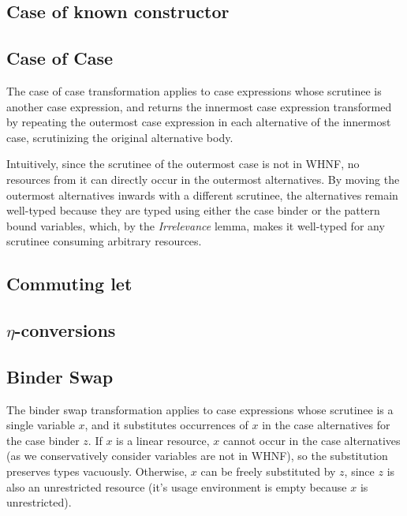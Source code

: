 \documentclass[acmsmall,review,anonymous,screen]{acmart}
\begin{document}
\subsection{Case of known constructor}



\subsection{Case of Case\label{sec:proof:caseofcase}}

The case of case transformation applies to case expressions whose scrutinee is
another case expression, and returns the innermost case expression transformed by repeating
the outermost case expression in each alternative of the innermost case,
scrutinizing the original alternative body.

Intuitively, since the scrutinee of the outermost case is not in WHNF, no
resources from it can directly occur in the outermost alternatives. By moving
the outermost alternatives inwards with a different scrutinee, the alternatives
remain well-typed because they are typed using either the case binder or the
pattern bound variables, which, by the \emph{Irrelevance} lemma, makes it
well-typed for any scrutinee consuming arbitrary resources.



\subsection{Commuting let}



\subsection{\texorpdfstring{$\eta$}{Eta}-conversions}



\subsection{Binder Swap}

The binder swap transformation applies to case expressions whose scrutinee is a
single variable $x$, and it substitutes occurrences of $x$ in the case
alternatives for the case binder $z$. If $x$ is a linear resource, $x$ cannot
occur in the case alternatives (as we conservatively consider variables are not
in WHNF), so the substitution preserves types vacuously. Otherwise, $x$ can be
freely substituted by $z$, since $z$ is also an unrestricted resource (it's
usage environment is empty because $x$ is unrestricted).





\end{document}
